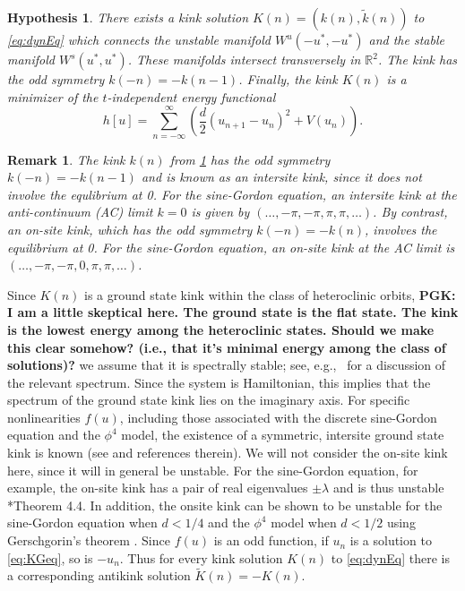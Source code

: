 \documentclass[12pt,reqno]{amsart}
\def\R{{\mathbb R}}
\newtheorem{hypothesis}{Hypothesis}
\newtheorem{remark}{Remark}
\begin{document}
\begin{hypothesis}\label{hyp:kinkexists}
There exists a kink solution $K(n) = (k(n),\tilde{k}(n))$ to \cref{eq:dynEq} which connects the unstable manifold $W^u(-u^*, -u^*)$ and the stable manifold $W^s(u^*, u^*)$. These manifolds intersect transversely in $\R^2$. 
The kink has the odd symmetry $k(-n) = -k(n-1)$. Finally, 
the kink $K(n)$ is a minimizer of the $t$-independent energy functional
\begin{equation}
h[u] = \sum_{n=-\infty}^\infty 
\left( \frac{d}{2} (u_{n+1} - u_n)^2 + V(u_n) \right).
\end{equation}
\end{hypothesis}

\begin{remark}
The kink $k(n)$ from \cref{hyp:kinkexists} has the odd symmetry $k(-n) = -k(n-1)$ and is known as an intersite kink, since it does not involve the equlibrium at 0. For the sine-Gordon equation, an intersite kink at the anti-continuum (AC) limit $k = 0$ is given by $(\dots, -\pi, -\pi, \pi, \pi, \dots)$. By contrast, an on-site kink, which has the odd symmetry $k(-n) = -k(n)$, involves the equilibrium at 0. For the sine-Gordon equation, an on-site kink at the AC limit is $(\dots, -\pi, -\pi, 0, \pi, \pi, \dots)$. 
\end{remark}

Since $K(n)$ is a ground state kink within the 
class of heteroclinic orbits,
{\bf PGK: I am a little skeptical here. The ground
state is the flat state. The kink is the lowest energy
among the heteroclinic states. Should we make this clear
somehow? (i.e., that it's minimal energy among the
class of solutions)?}
we assume  that it is spectrally stable; see, e.g.,~\cite{KevrekidisWeinstein2000} for a discussion of
the relevant spectrum. Since the system is Hamiltonian, this implies that the spectrum of the ground state kink lies on the imaginary axis. For specific nonlinearities $f(u)$, including those associated with the discrete sine-Gordon equation and the $\phi^4$ model, the existence of a symmetric, intersite ground state kink is known (see \cites{KevrekidisWeinstein2000,SGchapter} and references therein). We will not consider the on-site kink here, since it will in general be unstable. For the sine-Gordon equation, for example, the on-site kink has a pair of real eigenvalues $\pm \lambda$ and is thus unstable \cite{Kapitula2001}*{Theorem 4.4}. In addition, the onsite kink can be shown to be unstable for the sine-Gordon equation when $d < 1/4$ and the  $\phi^4$ model when $d < 1/2$ using Gerschgorin’s theorem \cite{SGchapter}. Since $f(u)$ is an odd function, if $u_n$ is a solution to \cref{eq:KGeq}, so is $-u_n$. Thus for every kink solution $K(n)$ to \cref{eq:dynEq} there is a corresponding antikink solution $\tilde{K}(n) = -K(n)$.
\end{document}
